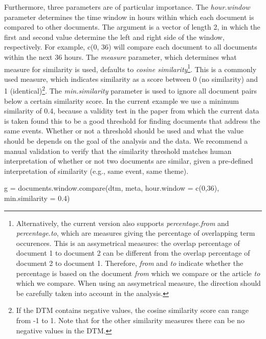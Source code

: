 Furthermore, three parameters are of particular importance. The
\emph{hour.window} parameter determines the time window in hours within
which each document is compared to other documents. The argument is a
vector of length 2, in which the first and second value determine the
left and right side of the window, respectively. For example, c(0, 36)
will compare each document to all documents within the next 36 hours.
The \emph{measure} parameter, which determines what measure for
similarity is used, defaults to \emph{cosine similarity}\footnote{Alternatively,
  the current version also supports \emph{percentage.from} and
  \emph{percentage.to}, which are measures giving the percentage of
  overlapping term occurences. This is an assymetrical measures: the
  overlap percentage of document 1 to document 2 can be different from
  the overlap percentage of document 2 to document 1. Therefore,
  \emph{from} and \emph{to} indicate whether the percentage is based on
  the document \emph{from} which we compare or the article \emph{to}
  which we compare. When using an assymetrical measure, the direction
  should be carefully taken into account in the analysis.}. This is a
commonly used measure, which indicates similarity as a score between 0
(no similarity) and 1 (identical)\footnote{If the DTM contains negative
  values, the cosine similarity score can range from -1 to 1. Note that
  for the other similarity measures there can be no negative values in
  the DTM.}. The \emph{min.similarity} parameter is used to ignore all
document pairs below a certain similarity score. In the current example
we use a minimum similarity of 0.4, because a validity test in the paper
from which the current data is taken found this to be a good threshold
for finding documents that address the same events. Whether or not a
threshold should be used and what the value should be depends on the
goal of the analysis and the data. We recommend a manual validation to
verify that the similarity threshold matches human interpretation of
whether or not two documents are similar, given a pre-defined
interpretation of similarity (e.g., same event, same theme).

\begin{Schunk}
\begin{Sinput}
g = documents.window.compare(dtm, meta,
                             hour.window = c(0,36), 
                             min.similarity = 0.4)
\end{Sinput}
\end{Schunk}

